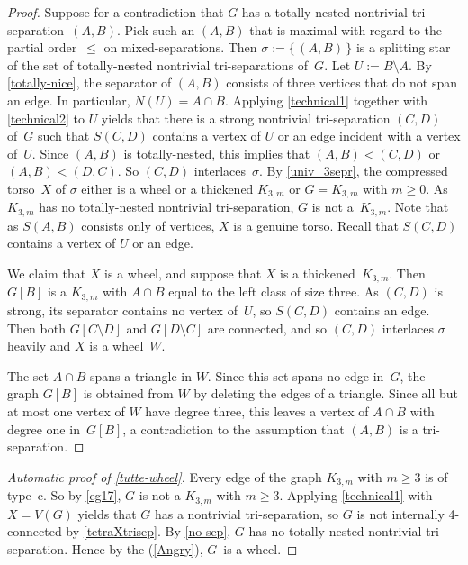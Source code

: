 \documentclass{aic}
\theoremstyle{plain}
\theoremstyle{definition}
\theoremstyle{plain}
\theoremstyle{plain}
\newcommand{\sm}{\setminus}
\renewcommand{\geq}{\geqslant}
\renewcommand{\le}{\leqslant}
\begin{document}
\begin{proof}
    Suppose for a contradiction that $G$ has a totally-nested nontrivial tri-separation~$(A,B)$. 
    Pick such an $(A,B)$ that is maximal with regard to the partial order~$\le$ on mixed-separations.
    Then $\sigma:=\{\,(A,B)\,\}$ is a splitting star of the set of totally-nested nontrivial tri-separations of~$G$. 
    Let $U:=B\sm A$.
    By \autoref{totally-nice}, the separator of $(A,B)$ consists of three vertices that do not span an edge.
    In particular, $N(U)=A\cap B$. 
    Applying \autoref{technical1} together with \autoref{technical2} to $U$ yields that there is a strong nontrivial tri-separation $(C,D)$ of~$G$ such that $S(C,D)$ contains a vertex of $U$ or an edge incident with a vertex of~$U$. 
    Since $(A,B)$ is totally-nested, this implies that
    $(A,B)<(C,D)$ or $(A,B)<(D,C)$.   
    So $(C,D)$ interlaces~$\sigma$.
    By \autoref{univ_3sepr}, the compressed torso~$X$ of $\sigma$ either is a wheel or a thickened $K_{3,m}$ or $G=K_{3,m}$ with $m\geq 0$.
    As $K_{3,m}$ has no totally-nested nontrivial tri-separation, $G$ is not a~$K_{3,m}$.
    Note that as $S(A,B)$ consists only of vertices, $X$ is a genuine torso. 
    Recall that $S(C,D)$ contains a vertex of $U$ or an edge. 
    
    We claim that $X$ is a wheel, and suppose that $X$ is a thickened~$K_{3,m}$.
    Then $G[B]$ is a $K_{3,m}$ with $A\cap B$ equal to the left class of size three.
    As $(C,D)$ is strong, its separator contains no vertex of~$U$, so $S(C,D)$ contains an edge. 
    Then both $G[C\sm D]$ and $G[D\sm C]$ are connected, and so $(C,D)$ interlaces $\sigma$ heavily and $X$ is a wheel~$W$.
    
    The set $A\cap B$ spans a triangle in $W$. 
    Since this set spans no edge in~$G$, the graph $G[B]$ is obtained from $W$ by deleting the edges of a triangle. 
    Since all but at most one vertex of $W$ have degree three, this leaves a vertex of $A\cap B$ with degree one in~$G[B]$, a contradiction to the assumption that $(A,B)$ is a tri-separation.
\end{proof}

\begin{proof}[Automatic proof of \autoref{tutte-wheel}]
Every edge of the graph $K_{3,m}$ with $m\geq 3$ is of type~c. So by \autoref{eg17}, $G$ is not a $K_{3,m}$ with $m\geq 3$.
Applying \autoref{technical1} with $X=V(G)$ yields that $G$ has a nontrivial tri-separation, so $G$ is not internally 4-connected by \autoref{tetraXtrisep}.
By \autoref{no-sep}, $G$ has no totally-nested nontrivial tri-separation.
Hence by the  (\ref{Angry}), $G$~is a wheel.
\end{proof}
\end{document}
